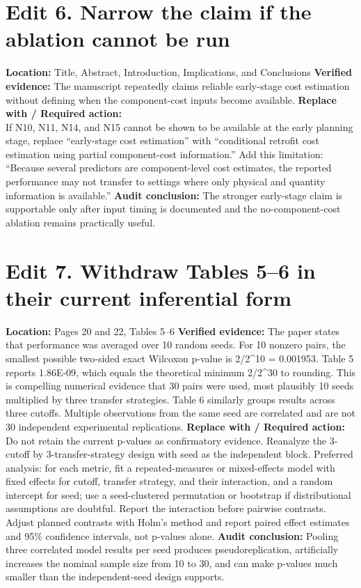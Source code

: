 \documentclass[11pt]{article}
\newcommand{\loc}[1]{\textbf{Location:} #1}
\newcommand{\current}[1]{\textbf{Verified evidence:} #1}
\newcommand{\replacewith}[1]{\textbf{Replace with / Required action:}\\{\color{blue}#1}}
\newcommand{\why}[1]{\textbf{Audit conclusion:} #1}
\begin{document}
\section*{Edit 6. Narrow the claim if the ablation cannot be run}
\loc{Title, Abstract, Introduction, Implications, and Conclusions}
\current{The manuscript repeatedly claims reliable early-stage cost estimation without defining when the component-cost inputs become available.}
\replacewith{If N10, N11, N14, and N15 cannot be shown to be available at the early planning stage, replace ``early-stage cost estimation'' with ``conditional retrofit cost estimation using partial component-cost information.'' Add this limitation: ``Because several predictors are component-level cost estimates, the reported performance may not transfer to settings where only physical and quantity information is available.''}
\why{The stronger early-stage claim is supportable only after input timing is documented and the no-component-cost ablation remains practically useful.}

\section*{Edit 7. Withdraw Tables 5--6 in their current inferential form}
\loc{Pages 20 and 22, Tables 5--6}
\current{The paper states that performance was averaged over 10 random seeds. For 10 nonzero pairs, the smallest possible two-sided exact Wilcoxon p-value is 2/2^10 = 0.001953. Table 5 reports 1.86E-09, which equals the theoretical minimum 2/2^30 to rounding. This is compelling numerical evidence that 30 pairs were used, most plausibly 10 seeds multiplied by three transfer strategies. Table 6 similarly groups results across three cutoffs. Multiple observations from the same seed are correlated and are not 30 independent experimental replications.}
\replacewith{Do not retain the current p-values as confirmatory evidence. Reanalyze the 3-cutoff by 3-transfer-strategy design with seed as the independent block. Preferred analysis: for each metric, fit a repeated-measures or mixed-effects model with fixed effects for cutoff, transfer strategy, and their interaction, and a random intercept for seed; use a seed-clustered permutation or bootstrap if distributional assumptions are doubtful. Report the interaction before pairwise contrasts. Adjust planned contrasts with Holm's method and report paired effect estimates and 95\% confidence intervals, not p-values alone.}
\why{Pooling three correlated model results per seed produces pseudoreplication, artificially increases the nominal sample size from 10 to 30, and can make p-values much smaller than the independent-seed design supports.}
\end{document}
